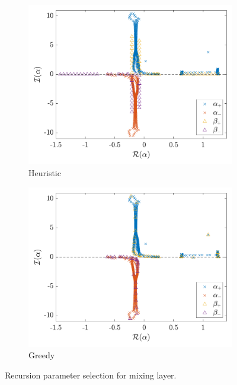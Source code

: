 \begin{figure}
    \centering
    \begin{subfigure}[b]{0.48\textwidth}
        \centering
        \includegraphics[width=1\linewidth]{figures/Mixing_Params_Heuristic.pdf}
        \caption{Heuristic}
        \label{fig:mixing-params-heuristic}
    \end{subfigure}
    \begin{subfigure}[b]{0.48\textwidth}
        \centering
        \includegraphics[width=1\linewidth]{figures/Mixing_Params_Greedy.pdf}
        \caption{Greedy}
        \label{fig:mixing-params-greedy}
    \end{subfigure}
    \caption{Recursion parameter selection for mixing layer.}
    \label{fig:mixing-params}
\end{figure}